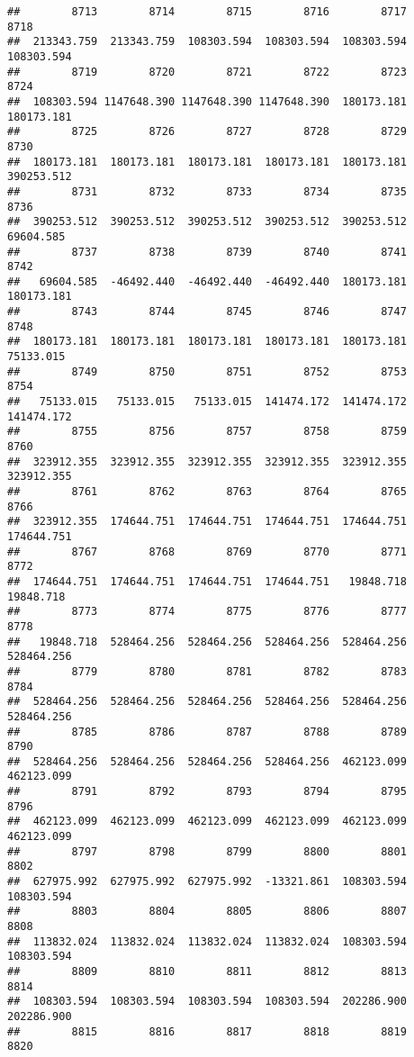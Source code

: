 \documentclass[
]{book}
\begin{document}
\begin{verbatim}
##        8713        8714        8715        8716        8717        8718 
##  213343.759  213343.759  108303.594  108303.594  108303.594  108303.594 
##        8719        8720        8721        8722        8723        8724 
##  108303.594 1147648.390 1147648.390 1147648.390  180173.181  180173.181 
##        8725        8726        8727        8728        8729        8730 
##  180173.181  180173.181  180173.181  180173.181  180173.181  390253.512 
##        8731        8732        8733        8734        8735        8736 
##  390253.512  390253.512  390253.512  390253.512  390253.512   69604.585 
##        8737        8738        8739        8740        8741        8742 
##   69604.585  -46492.440  -46492.440  -46492.440  180173.181  180173.181 
##        8743        8744        8745        8746        8747        8748 
##  180173.181  180173.181  180173.181  180173.181  180173.181   75133.015 
##        8749        8750        8751        8752        8753        8754 
##   75133.015   75133.015   75133.015  141474.172  141474.172  141474.172 
##        8755        8756        8757        8758        8759        8760 
##  323912.355  323912.355  323912.355  323912.355  323912.355  323912.355 
##        8761        8762        8763        8764        8765        8766 
##  323912.355  174644.751  174644.751  174644.751  174644.751  174644.751 
##        8767        8768        8769        8770        8771        8772 
##  174644.751  174644.751  174644.751  174644.751   19848.718   19848.718 
##        8773        8774        8775        8776        8777        8778 
##   19848.718  528464.256  528464.256  528464.256  528464.256  528464.256 
##        8779        8780        8781        8782        8783        8784 
##  528464.256  528464.256  528464.256  528464.256  528464.256  528464.256 
##        8785        8786        8787        8788        8789        8790 
##  528464.256  528464.256  528464.256  528464.256  462123.099  462123.099 
##        8791        8792        8793        8794        8795        8796 
##  462123.099  462123.099  462123.099  462123.099  462123.099  462123.099 
##        8797        8798        8799        8800        8801        8802 
##  627975.992  627975.992  627975.992  -13321.861  108303.594  108303.594 
##        8803        8804        8805        8806        8807        8808 
##  113832.024  113832.024  113832.024  113832.024  108303.594  108303.594 
##        8809        8810        8811        8812        8813        8814 
##  108303.594  108303.594  108303.594  108303.594  202286.900  202286.900 
##        8815        8816        8817        8818        8819        8820 

\end{verbatim}
\end{document}
